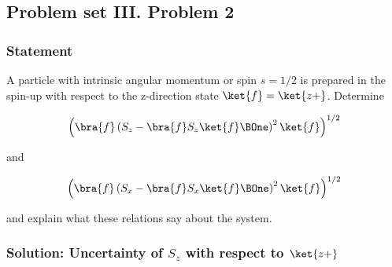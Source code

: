 \subsection{Problem set III.  Problem 2}

\subsubsection{Statement}
A particle with intrinsic angular momentum or spin $s=1/2$ is prepared in the spin-up with respect to the z-direction state $\ket{f}=\ket{z+}$. Determine

\begin{align}\label{eqn:qmIproblemSet3:3}
\left(\bra{f} \left( S_z - \bra{f} S_z \ket{f} \BOne \right)^2 \ket{f} \right)^{1/2}
\end{align}

and 

\begin{align}\label{eqn:qmIproblemSet3:4}
\left(\bra{f} \left( S_x - \bra{f} S_x \ket{f} \BOne \right)^2 \ket{f} \right)^{1/2}
\end{align}

and explain what these relations say about the system.

\subsubsection{Solution:  Uncertainty of \texorpdfstring{$S_z$}{S z} with respect to \texorpdfstring{$\ket{z+}$}{ket z plus}}

